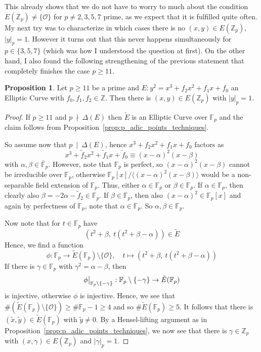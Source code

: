 \documentclass{scrartcl}
\newcommand{\Z}{\mathbb{Z}}
\newcommand{\F}{\mathbb{F}}
\renewcommand{\O}{\mathcal{O}}
\newcommand{\notdivides}{\ \nmid \ }
\newcommand{\divides}{\ \mid \ }
\newcommand\restr[2]{{
    \left.\kern-\nulldelimiterspace
    #1
    \vphantom{\big|}
    \right|_{#2}
}}
\theoremstyle{definition}
\newtheorem{prop}[subsection]{Proposition}
\begin{document}
This already shows that we do not have to worry to much about the condition $E(\Z_p) \neq \{\O\}$ for $p \neq 2, 3, 5, 7$ prime, as we expect that it is fulfilled quite often.
My next try was to characterize in which cases there is no $(x, y) \in E(\Z_p)$, $|y|_p = 1$.
However it turns out that this never happens simultaneously for $p \in \{ 3, 5, 7 \}$ (which was how I understood the question at first).
On the other hand, I also found the following strengthening of the previous statement that completely finishes the case $p \geq 11$.
\begin{prop}
    \label{prop:points_in_EZp}
    Let $p \geq 11$ be a prime and $E: y^2 = x^3 + f_2 x^2 + f_1 x + f_0$ an Elliptic Curve with $f_0, f_1, f_2 \in \Z$.
    Then there is $(x, y) \in E(\Z_p)$ with $|y|_p = 1$.
\end{prop}
\begin{proof}
    If $p \geq 11$ and $p \notdivides \Delta(E)$ then $\tilde{E}$ is an Elliptic Curve over $\F_p$ and the claim follows from Proposition~\ref{prop:p_adic_points_techniques}.
    
    So assume now that $p \divides \Delta(E)$, hence $x^3 + f_2 x^2 + f_1 x + f_0$ factors as
    \begin{equation*}
        x^3 + \tilde{f}_2 x^2 + \tilde{f}_1 x + \tilde{f}_0 \equiv (x - \alpha)^2(x - \beta)
    \end{equation*}
    with $\alpha, \beta \in \bar{\F}_p$.
    However, note that $\F_p$ is perfect, so $(x - \alpha)^2(x - \beta)$ cannot be irreducible over $\F_p$, otherwise $\F_p[x] / \langle(x - \alpha)^2(x - \beta)\rangle$ would be a non-separable field extension of $\F_p$.
    Thus, either $\alpha \in \F_p$ or $\beta \in \F_p$.
    If $\alpha \in \F_p$, then clearly also $\beta = -2\alpha - \tilde{f}_2 \in \F_p$.
    If $\beta \in \F_p$, then also $(x - \alpha)^2 \in \F_p[x]$ and again by perfectness of $\F_p$, note that $\alpha \in \F_p$.
    So $\alpha, \beta \in \F_p$.

    Now note that for $t \in \F_p$ have
    \begin{equation*}
        \left( t^2 + \beta, \ t (t^2 + \beta - \alpha) \right) \in \tilde{E}
    \end{equation*}
    Hence, we find a function
    \begin{equation*}
        \phi: \F_p \to \tilde{E}(\F_p) \setminus \{\O\}, \quad t \mapsto \left( t^2 + \beta, \ t (t^2 + \beta - \alpha) \right)
    \end{equation*}
    If there is $\gamma \in \F_p$ with $\gamma^2 = \alpha - \beta$, then 
    \begin{equation*}
        \restr{\phi}{\F_p \setminus \{-\gamma\}}: \F_p \setminus \{-\gamma\} \to \tilde{E}(\F_p)
    \end{equation*}
    is injective, otherwise $\phi$ is injective.
    Hence, we see that $\#(\tilde{E}(\F_p) \setminus \{\O\}) \geq \#\F_p - 1 \geq 4$ and so $\#\tilde{E}(\F_p) \geq 5$.
    It follows that there is $(\tilde{x}, \tilde{y}) \in \tilde{E}(\F_p)$ with $\tilde{y} \neq 0$.
    By a Hensel-lifting argument as in Proposition~\ref{prop:p_adic_points_techniques}, we now see that there is $\gamma \in \Z_p$ with $(x, \gamma) \in E(\Z_p)$ and $|\gamma|_p = 1$.
\end{proof}
\end{document}
